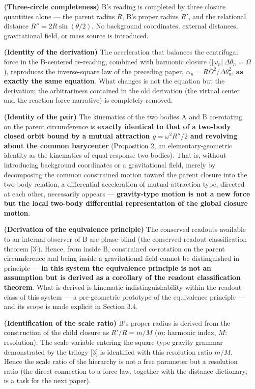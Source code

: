 \documentclass[
  a4paper,
]{article}
\begin{document}
\textbf{(Three-circle completeness)} B's reading is completed by three
closure quantities alone --- the parent radius \(R\), B's proper radius
\(R'\), and the relational distance \(R''=2R\sin(\theta/2)\). No
background coordinates, external distances, gravitational field, or mass
source is introduced.

\textbf{(Identity of the derivation)} The acceleration that balances the
centrifugal force in the B-centered re-reading, combined with harmonic
closure (\(|\omega_n|\,\Delta\theta_n=\Omega\)), reproduces the
inverse-square law of the preceding paper,
\(\alpha_n=R\Omega^2/\Delta\theta_n^2\), \textbf{as exactly the same
equation}. What changes is not the equation but the derivation; the
arbitrariness contained in the old derivation (the virtual center and
the reaction-force narrative) is completely removed.

\textbf{(Identity of the pair)} The kinematics of the two bodies A and B
co-rotating on the parent circumference is \textbf{exactly identical to
that of a two-body closed orbit bound by a mutual attraction
\(g=\omega^2 R''/2\) and revolving about the common barycenter}
(Proposition 2, an elementary-geometric identity as the kinematics of
equal-response two bodies). That is, without introducing background
coordinates or a gravitational field, merely by decomposing the common
constrained motion toward the parent closure into the two-body relation,
a differential acceleration of mutual-attraction type, directed at each
other, necessarily appears --- \textbf{gravity-type motion is not a new
force but the local two-body differential representation of the global
closure motion}.

\textbf{(Derivation of the equivalence principle)} The conserved
readouts available to an internal observer of B are phase-blind (the
conserved-readout classification theorem {[}3{]}). Hence, from inside B,
constrained co-rotation on the parent circumference and being inside a
gravitational field cannot be distinguished in principle --- \textbf{in
this system the equivalence principle is not an assumption but is
derived as a corollary of the readout classification theorem}. What is
derived is kinematic indistinguishability within the readout class of
this system --- a pre-geometric prototype of the equivalence principle
--- and its scope is made explicit in Section 3.4.

\textbf{(Identification of the scale ratio)} B's proper radius is
derived from the construction of the child closure as \(R'/R=m/M\)
(\(m\): harmonic index, \(M\): resolution). The scale variable entering
the square-type gravity grammar demonstrated by the trilogy {[}3{]} is
identified with this resolution ratio \(m/M\). Hence the scale ratio of
the hierarchy is not a free parameter but a resolution ratio (the direct
connection to a force law, together with the distance dictionary, is a
task for the next paper).
\end{document}

